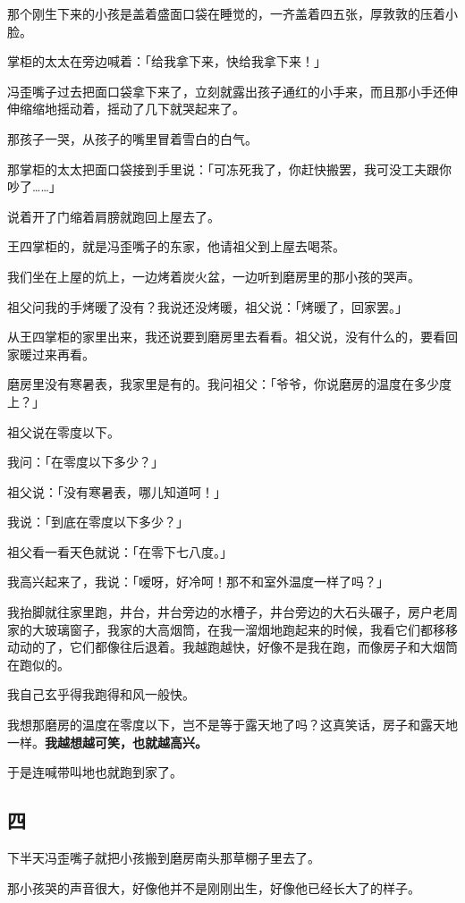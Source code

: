 \documentclass[UTF8]{ctexart}
\begin{document}
那个刚生下来的小孩是盖着盛面口袋在睡觉的，一齐盖着四五张，厚敦敦的压着小脸。

掌柜的太太在旁边喊着：「给我拿下来，快给我拿下来！」

冯歪嘴子过去把面口袋拿下来了，立刻就露出孩子通红的小手来，而且那小手还伸伸缩缩地摇动着，摇动了几下就哭起来了。

那孩子一哭，从孩子的嘴里冒着雪白的白气。

那掌柜的太太把面口袋接到手里说：「可冻死我了，你赶快搬罢，我可没工夫跟你吵了……」

说着开了门缩着肩膀就跑回上屋去了。

王四掌柜的，就是冯歪嘴子的东家，他请祖父到上屋去喝茶。

我们坐在上屋的炕上，一边烤着炭火盆，一边听到磨房里的那小孩的哭声。

祖父问我的手烤暖了没有？我说还没烤暖，祖父说：「烤暖了，回家罢。」

从王四掌柜的家里出来，我还说要到磨房里去看看。祖父说，没有什么的，要看回家暖过来再看。

磨房里没有寒暑表，我家里是有的。我问祖父：「爷爷，你说磨房的温度在多少度上？」

祖父说在零度以下。

我问：「在零度以下多少？」

祖父说：「没有寒暑表，哪儿知道呵！」

我说：「到底在零度以下多少？」

祖父看一看天色就说：「在零下七八度。」

我高兴起来了，我说：「嗳呀，好冷呵！那不和室外温度一样了吗？」

我抬脚就往家里跑，井台，井台旁边的水槽子，井台旁边的大石头碾子，房户老周家的大玻璃窗子，我家的大高烟筒，在我一溜烟地跑起来的时候，我看它们都移移动动的了，它们都像往后退着。我越跑越快，好像不是我在跑，而像房子和大烟筒在跑似的。

我自己玄乎得我跑得和风一般快。

我想那磨房的温度在零度以下，岂不是等于露天地了吗？这真笑话，房子和露天地一样。\textbf{我越想越可笑，也就越高兴。}

于是连喊带叫地也就跑到家了。

\subsection{四}

下半天冯歪嘴子就把小孩搬到磨房南头那草棚子里去了。

那小孩哭的声音很大，好像他并不是刚刚出生，好像他已经长大了的样子。
\end{document}

